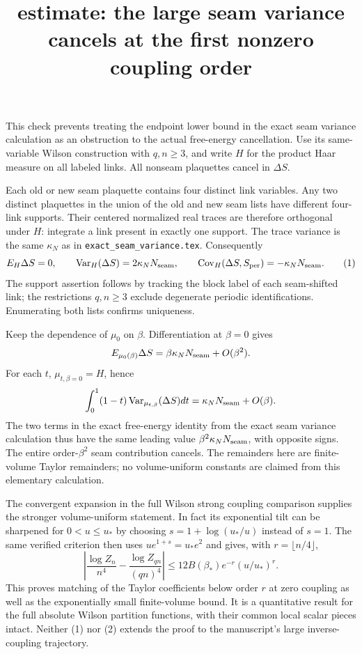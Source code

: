 \documentclass{article}
\title{estimate: the large seam variance cancels at the first nonzero coupling order}\author{}\date{}
\begin{document}
\maketitle
This check prevents treating the endpoint lower bound in the exact seam variance calculation as an obstruction to the actual free-energy cancellation. Use its same-variable Wilson construction with $q,n\geq3$, and write $H$ for the product Haar measure on all labeled links. All nonseam plaquettes cancel in $\Delta S$.

Each old or new seam plaquette contains four distinct link variables. Any two distinct plaquettes in the union of the old and new seam lists have different four-link supports. Their centered normalized real traces are therefore orthogonal under $H$: integrate a link present in exactly one support. The trace variance is the same $\kappa_N$ as in \texttt{exact\_seam\_variance.tex}. Consequently
\[
 E_H\Delta S=0,\qquad
 \operatorname{Var}_H(\Delta S)=2\kappa_N N_{\rm seam},\qquad
 \operatorname{Cov}_H(\Delta S,S_{\rm per})=-\kappa_NN_{\rm seam}.
 \tag{1}
\]
The support assertion follows by tracking the block label of each seam-shifted link; the restrictions $q,n\geq3$ exclude degenerate periodic identifications. Enumerating both lists confirms uniqueness.

Keep the dependence of $\mu_0$ on $\beta$. Differentiation at $\beta=0$ gives
\[
 E_{\mu_0(\beta)}\Delta S=\beta\kappa_NN_{\rm seam}+O(\beta^2).
\]
For each $t$, $\mu_{t,\beta=0}=H$, hence
\[
 \int_0^1(1-t)\operatorname{Var}_{\mu_{t,\beta}}(\Delta S)dt
 =\kappa_NN_{\rm seam}+O(\beta).
\]
The two terms in the exact free-energy identity from the exact seam variance calculation thus have the same leading value $\beta^2\kappa_NN_{\rm seam}$, with opposite signs. The entire order-$\beta^2$ seam contribution cancels. The remainders here are finite-volume Taylor remainders; no volume-uniform constants are claimed from this elementary calculation.

The convergent expansion in the full Wilson strong coupling comparison supplies the stronger volume-uniform statement. In fact its exponential tilt can be sharpened for $0<u\leq u_*$ by choosing
$s=1+\log(u_*/u)$ instead of $s=1$. The same verified criterion then uses $ue^{1+s}=u_*e^2$ and gives, with $r=\lfloor n/4\rfloor$,
\[
 \left|\frac{\log Z_n}{n^4}-\frac{\log Z_{qn}}{(qn)^4}\right|
 \leq12B(\beta_*)e^{-r}(u/u_*)^r.
 \tag{2}
\]
This proves matching of the Taylor coefficients below order $r$ at zero coupling as well as the exponentially small finite-volume bound. It is a quantitative result for the full absolute Wilson partition functions, with their common local scalar pieces intact. Neither (1) nor (2) extends the proof to the manuscript's large inverse-coupling trajectory.
\end{document}
